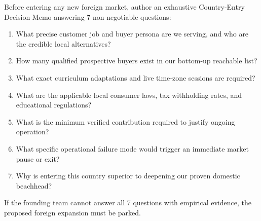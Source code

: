 Before entering any new foreign market, author an exhaustive Country-Entry Decision Memo answering 7 non-negotiable questions:
\begin{enumerate}
\item What precise customer job and buyer persona are we serving, and who are the credible local alternatives?
\item How many qualified prospective buyers exist in our bottom-up reachable list?
\item What exact curriculum adaptations and live time-zone sessions are required?
\item What are the applicable local consumer laws, tax withholding rates, and educational regulations?
\item What is the minimum verified contribution required to justify ongoing operation?
\item What specific operational failure mode would trigger an immediate market pause or exit?
\item Why is entering this country superior to deepening our proven domestic beachhead?
\end{enumerate}
If the founding team cannot answer all 7 questions with empirical evidence, the proposed foreign expansion must be parked.
